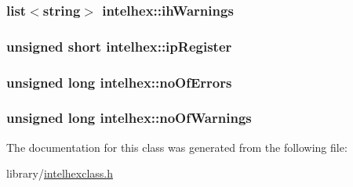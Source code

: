 \hypertarget{classintelhex_a0ae0e9a75bdfaa50d6d0266bb3d56ed1}{
\subsubsection[{ih\-Warnings}]{\setlength{\rightskip}{0pt plus 5cm}list$<$string$>$ intelhex\-::ih\-Warnings}}\label{classintelhex_a0ae0e9a75bdfaa50d6d0266bb3d56ed1}
\hypertarget{classintelhex_acf63100ba6ba58da893f29596560efbd}{
\subsubsection[{ip\-Register}]{\setlength{\rightskip}{0pt plus 5cm}unsigned short intelhex\-::ip\-Register}}\label{classintelhex_acf63100ba6ba58da893f29596560efbd}
\hypertarget{classintelhex_a451b78972165b898e91a129670fce919}{
\subsubsection[{no\-Of\-Errors}]{\setlength{\rightskip}{0pt plus 5cm}unsigned long intelhex\-::no\-Of\-Errors}}\label{classintelhex_a451b78972165b898e91a129670fce919}
\hypertarget{classintelhex_a5ea3789cc9ea71c9b35322aabca05158}{
\subsubsection[{no\-Of\-Warnings}]{\setlength{\rightskip}{0pt plus 5cm}unsigned long intelhex\-::no\-Of\-Warnings}}\label{classintelhex_a5ea3789cc9ea71c9b35322aabca05158}


The documentation for this class was generated from the following file\-:\begin{DoxyCompactItemize}
\item 
library/\hyperlink{intelhexclass_8h}{intelhexclass.\-h}\end{DoxyCompactItemize}
